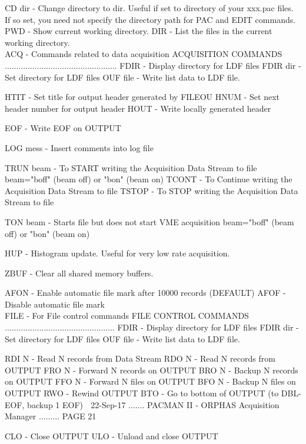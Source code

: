    CD dir     - Change directory to dir.  Useful if set to directory of your
                xxx.pac files.  If so set, you need not specify the directory
                path for PAC and EDIT commands.
   PWD        - Show current working directory.
   DIR        - List the files in the current working directory.
   $$$$ACQ  - Commands related to data acquisition
   ACQUISITION COMMANDS .................................................
   FDIR      - Display directory for LDF files
   FDIR dir  - Set directory for LDF files
   OUF file  - Write list data to LDF file.
 
   HTIT      - Set title for output header generated by FILEOU
   HNUM      - Set next header number for output header
   HOUT      - Write locally generated header
 
   EOF       - Write EOF on OUTPUT
 
   LOG mess  - Insert comments into log file
 
   TRUN beam - To START writing the Acquisition Data Stream to file
               beam="boff" (beam off) or "bon" (beam on)
   TCONT     - To Continue writing the Acquisition Data Stream to file
   TSTOP     - To STOP writing the Acquisition Data Stream to file
 
   TON beam  - Starts file but does not start VME acquisition
               beam="boff" (beam off) or "bon" (beam on)
 
   HUP       - Histogram update.  Useful for very low rate acquisition.
 
   ZBUF      - Clear all shared memory buffers.
 
   AFON      - Enable automatic file mark after 10000 records (DEFAULT)
   AFOF      - Disable automatic file mark
   $$$$FILE - For File control commands
   FILE CONTROL COMMANDS ................................................
   FDIR      - Display directory for LDF files
   FDIR dir  - Set directory for LDF files
   OUF file  - Write list data to LDF file.
 
   RDI  N    - Read    N records from Data Stream
   RDO  N    - Read    N records from OUTPUT
   FRO  N    - Forward N records on   OUTPUT
   BRO  N    - Backup  N records on   OUTPUT
   FFO  N    - Forward N files   on   OUTPUT
   BFO  N    - Backup  N files   on   OUTPUT
   RWO       - Rewind           OUTPUT
   BTO       - Go to bottom of  OUTPUT (to DBL-EOF, backup 1 EOF)
    
   22-Sep-17 ....... PACMAN II - ORPHAS Acquisition Manager ......... PAGE  21
 
 
   CLO       - Close            OUTPUT
   ULO       - Unload and close OUTPUT
 
